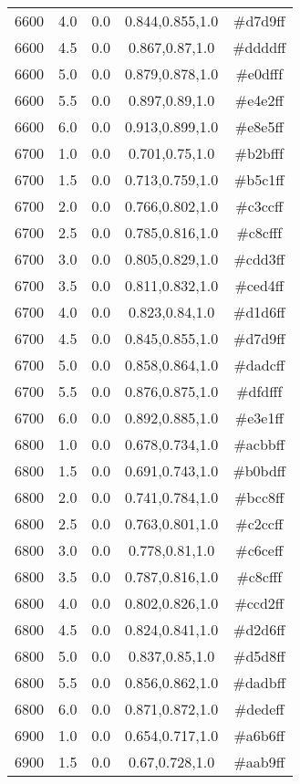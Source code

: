 \begin{tabular}{ccccc}
6600 & 4.0 & 0.0 & 0.844,0.855,1.0 & \#d7d9ff \\ 
6600 & 4.5 & 0.0 & 0.867,0.87,1.0 & \#ddddff \\ 
6600 & 5.0 & 0.0 & 0.879,0.878,1.0 & \#e0dfff \\ 
6600 & 5.5 & 0.0 & 0.897,0.89,1.0 & \#e4e2ff \\ 
6600 & 6.0 & 0.0 & 0.913,0.899,1.0 & \#e8e5ff \\ 
6700 & 1.0 & 0.0 & 0.701,0.75,1.0 & \#b2bfff \\ 
6700 & 1.5 & 0.0 & 0.713,0.759,1.0 & \#b5c1ff \\ 
6700 & 2.0 & 0.0 & 0.766,0.802,1.0 & \#c3ccff \\ 
6700 & 2.5 & 0.0 & 0.785,0.816,1.0 & \#c8cfff \\ 
6700 & 3.0 & 0.0 & 0.805,0.829,1.0 & \#cdd3ff \\ 
6700 & 3.5 & 0.0 & 0.811,0.832,1.0 & \#ced4ff \\ 
6700 & 4.0 & 0.0 & 0.823,0.84,1.0 & \#d1d6ff \\ 
6700 & 4.5 & 0.0 & 0.845,0.855,1.0 & \#d7d9ff \\ 
6700 & 5.0 & 0.0 & 0.858,0.864,1.0 & \#dadcff \\ 
6700 & 5.5 & 0.0 & 0.876,0.875,1.0 & \#dfdfff \\ 
6700 & 6.0 & 0.0 & 0.892,0.885,1.0 & \#e3e1ff \\ 
6800 & 1.0 & 0.0 & 0.678,0.734,1.0 & \#acbbff \\ 
6800 & 1.5 & 0.0 & 0.691,0.743,1.0 & \#b0bdff \\ 
6800 & 2.0 & 0.0 & 0.741,0.784,1.0 & \#bcc8ff \\ 
6800 & 2.5 & 0.0 & 0.763,0.801,1.0 & \#c2ccff \\ 
6800 & 3.0 & 0.0 & 0.778,0.81,1.0 & \#c6ceff \\ 
6800 & 3.5 & 0.0 & 0.787,0.816,1.0 & \#c8cfff \\ 
6800 & 4.0 & 0.0 & 0.802,0.826,1.0 & \#ccd2ff \\ 
6800 & 4.5 & 0.0 & 0.824,0.841,1.0 & \#d2d6ff \\ 
6800 & 5.0 & 0.0 & 0.837,0.85,1.0 & \#d5d8ff \\ 
6800 & 5.5 & 0.0 & 0.856,0.862,1.0 & \#dadbff \\ 
6800 & 6.0 & 0.0 & 0.871,0.872,1.0 & \#dedeff \\ 
6900 & 1.0 & 0.0 & 0.654,0.717,1.0 & \#a6b6ff \\ 
6900 & 1.5 & 0.0 & 0.67,0.728,1.0 & \#aab9ff \\ 

\end{tabular}
